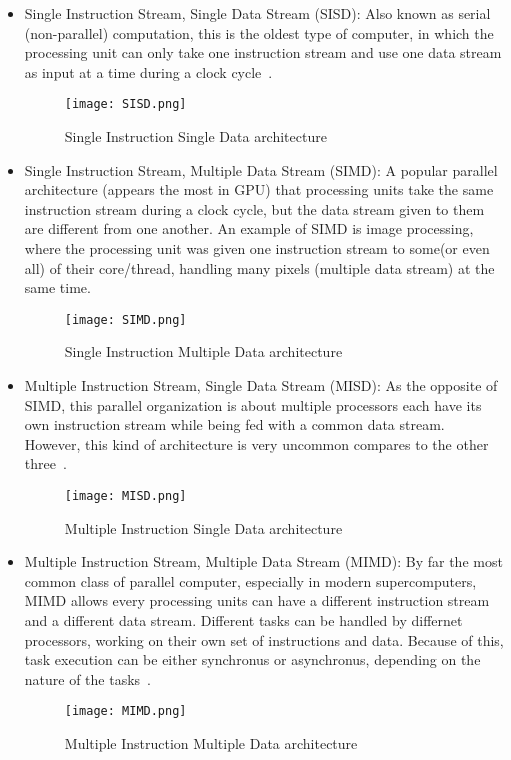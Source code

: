 \begin{itemize}
	\item Single Instruction Stream, Single Data Stream (SISD): Also known as serial (non-parallel) computation, this is the oldest type of computer, in which the processing unit can only take one instruction stream and use one data stream as input at a time during a clock cycle~\cite{intro_parallel}.
	\begin{figure}[H]
	\texttt{[image: SISD.png]}
	\centering
	\caption{Single Instruction Single Data architecture}
	\end{figure}
	\item Single Instruction Stream, Multiple Data Stream (SIMD): A popular parallel architecture (appears the most in GPU) that processing units take the same instruction stream during a clock cycle, but the data stream given to them are different from one another. An example of SIMD is image processing, where the processing unit was given one instruction stream to some(or even all) of their core/thread, handling many pixels (multiple data stream) at the same time.
	\begin{figure}[H]
	\texttt{[image: SIMD.png]}
	\centering
	\caption{Single Instruction Multiple Data architecture}
	\end{figure}
	\item Multiple Instruction Stream, Single Data Stream (MISD): As the opposite of SIMD, this parallel organization is about multiple processors each have its own instruction stream while being fed with a common data stream. However, this kind of architecture is very uncommon compares to the other three~\cite{intro_parallel}.
	\begin{figure}[H]
	\texttt{[image: MISD.png]}
	\centering
	\caption{Multiple Instruction Single Data architecture}
	\end{figure}
	\item Multiple Instruction Stream, Multiple Data Stream (MIMD): By far the most common class of parallel computer, especially in modern supercomputers, MIMD allows every processing units can have a different instruction stream and a different data stream. Different tasks can be handled by differnet processors, working on their own set of instructions and data. Because of this, task execution can be either synchronus or asynchronus, depending on the nature of the tasks~\cite{intro_parallel}.
	\begin{figure}[H]
	\texttt{[image: MIMD.png]}
	\centering
	\caption{Multiple Instruction Multiple Data architecture}
	\end{figure}
\end{itemize}


